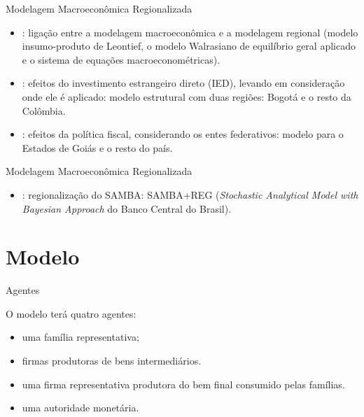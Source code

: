 \documentclass[10pt]{beamer}
\let\olditem\item
\renewcommand{\item}{%
	\olditem\vspace{5pt}}
\begin{document}
\begin{frame}[fragile]{Modelagem Macroeconômica Regionalizada}

\begin{itemize}
	\item \textcite{rickman_modern_2010}: ligação entre a modelagem macroeconômica e a modelagem regional (modelo insumo-produto de
	Leontief, o modelo Walrasiano de equilíbrio geral aplicado e o sistema de equações macroeconométricas).

	\item \textcite{mora_fdi_2019}: efeitos do investimento estrangeiro direto (IED), levando em consideração onde ele é aplicado: modelo estrutural com duas regiões: Bogotá e o resto da Colômbia.

	\item \textcite{costa_junior_dsge_2022}: efeitos da política fiscal, considerando os entes federativos: modelo para o Estados de Goiás e o resto do país.
\end{itemize}
		
\end{frame}


\begin{frame}[fragile]{Modelagem Macroeconômica Regionalizada}
	
	\begin{itemize}
		\item \textcite{osterno_uma_2022}: regionalização do SAMBA: SAMBA+REG (\textit{Stochastic Analytical Model with Bayesian Approach} do Banco Central do Brasil).
	\end{itemize}
	
\end{frame}


\section{Modelo}
	
	
\begin{frame}{Agentes}

O modelo terá quatro agentes:
\begin{itemize}
	\item uma família representativa;
	
	\item firmas produtoras de bens intermediários.
	
	\item uma firma representativa produtora do bem final consumido pelas famílias.

	\item uma autoridade monetária.
\end{itemize}		

\end{frame}
\end{document}

